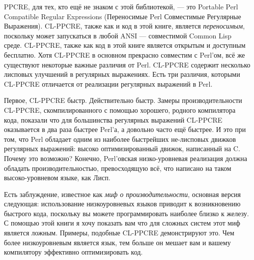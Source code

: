 PPCRE, для тех, кто ещё не знаком с этой библиотекой, --- это Portable Perl Compatible Regular Expressions (Переносимые Perl Совместимые Регулярные Выражения). CL-PPCRE, также как и код в этой книге, является \emph{переносимым}, поскольку может запускаться в любой ANSI --- совместимой Common Lisp среде. CL-PPCRE, также как код в этой книге является открытым и доступным бесплатно. Хотя CL-PPCRE в основном прекрасно совместим с Perl'ом, всё же существуют некоторые важные различия от Perl. CL-PPCRE содержит несколько лисповых улучшений в регулярных выражениях. Есть три различия, которыми CL-PPCRE отличается от реализации регулярных выражений в Perl.

Первое, CL-PPCRE быстр. Действительно быстр. Замеры производительности CL-PPCRE, скомпилированного с помощью хорошего, родного компилятора кода, показали что для большинства регулярных выражений CL-PPCRE оказывается в два раза быстрее Perl'а, а довольно часто ещё быстрее. И это при том, что Perl обладает одним из наиболее быстрейших не-лисповых движков регулярных выражений: высоко оптимизированный движок, написанный на C. Почему это возможно? Конечно, Perl'овская низко-уровневая реализация должна обладать производительностью, превосходящую всё, что написано на таком высоко-уровневом языке, как Лисп.

Есть заблуждение, известное как \emph{миф о производительности}, основная версия следующая: использование низкоуровневых языков приводит к возникновению быстрого кода, поскольку вы можете программировать наиболее близко к железу. С помощью этой книги я хочу показать вам что для сложных систем этот миф является ложным. Примеры, подобные CL-PPCRE демонстрируют это. Чем более низкоуровневым является язык, тем больше он мешает вам и вашему компилятору эффективно оптимизировать код.

